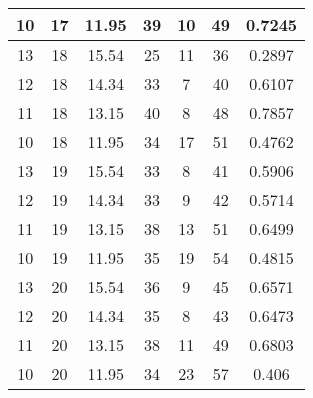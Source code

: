 \documentclass[letterpaper, 12pt]{article}
\begin{document}
\begin{longtable}{|c|c|c|c|c|c|c|}
\hline
10 & 17 & 11.95 & 39 & 10 & 49 & 0.7245 \\
\hline
13 & 18 & 15.54 & 25 & 11 & 36 & 0.2897 \\
\hline
12 & 18 & 14.34 & 33 & 7 & 40 & 0.6107 \\
\hline
11 & 18 & 13.15 & 40 & 8 & 48 & 0.7857 \\
\hline
10 & 18 & 11.95 & 34 & 17 & 51 & 0.4762 \\
\hline
13 & 19 & 15.54 & 33 & 8 & 41 & 0.5906 \\
\hline
12 & 19 & 14.34 & 33 & 9 & 42 & 0.5714 \\
\hline
11 & 19 & 13.15 & 38 & 13 & 51 & 0.6499 \\
\hline
10 & 19 & 11.95 & 35 & 19 & 54 & 0.4815 \\
\hline
13 & 20 & 15.54 & 36 & 9 & 45 & 0.6571 \\
\hline
12 & 20 & 14.34 & 35 & 8 & 43 & 0.6473 \\
\hline
11 & 20 & 13.15 & 38 & 11 & 49 & 0.6803 \\
\hline
10 & 20 & 11.95 & 34 & 23 & 57 & 0.406 \\
\hline
\end{longtable}
\end{document}
